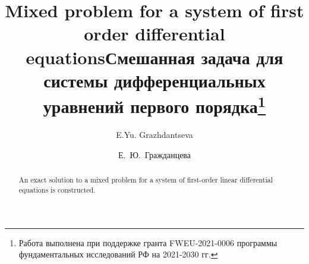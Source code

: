 \begin{englishtitle}
\title{Mixed problem for a system of first order differential equations}
\author{E.Yu. Grazhdantseva}

\maketitle

\begin{abstract}
An exact solution to a mixed problem for a system of first-order linear differential equations is constructed.

\end{abstract}

\end{englishtitle}

\iffalse
\documentclass[12pt]{llncs}
\usepackage[T2A]{fontenc}
\usepackage[utf8]{inputenc}
\usepackage[english,russian]{babel}
\usepackage[russian]{nla}




\fi

\title{Смешанная задача для системы дифференциальных уравнений первого порядка\thanks{Работа выполнена при поддержке гранта FWEU-2021-0006 программы фундаментальных исследований РФ на 2021-2030 гг.} 
 }
\author{Е.~Ю.~Гражданцева }



\maketitle

